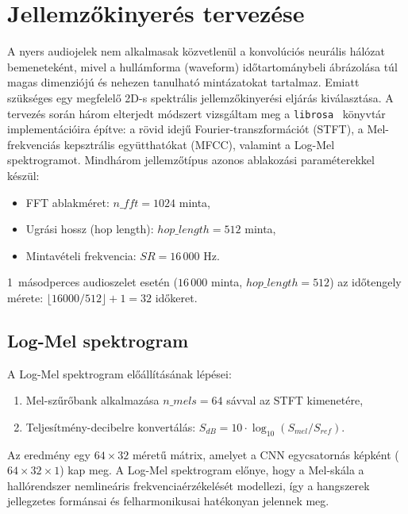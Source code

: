 \section{Jellemzőkinyerés tervezése}
\label{sec:feature_extraction}

A nyers audiojelek nem alkalmasak közvetlenül a konvolúciós neurális hálózat bemeneteként, mivel a hullámforma (waveform) időtartománybeli ábrázolása túl magas dimenziójú és nehezen tanulható mintázatokat tartalmaz. Emiatt szükséges egy megfelelő 2D-s spektrális jellemzőkinyerési eljárás kiválasztása. A tervezés során három elterjedt módszert vizsgáltam meg a \texttt{librosa}~\cite{mcfee2015librosa} könyvtár implementációira építve: a rövid idejű Fourier-transzformációt (STFT), a Mel-frekvenciás kepsztrális együtthatókat (MFCC), valamint a Log-Mel spektrogramot. Mindhárom jellemzőtípus azonos ablakozási paraméterekkel készül:

\begin{itemize}
  \item FFT ablakméret: $n\_fft = 1024$ minta,
  \item Ugrási hossz (hop length): $hop\_length = 512$ minta,
  \item Mintavételi frekvencia: $SR = 16\,000$ Hz.
\end{itemize}

1~másodperces audioszelet esetén ($16\,000$ minta, $hop\_length = 512$) az időtengely mérete: $\lfloor 16000 / 512 \rfloor + 1 = 32$ időkeret.

\subsection{Log-Mel spektrogram}

A Log-Mel spektrogram előállításának lépései:

\begin{enumerate}
  \item Mel-szűrőbank alkalmazása $n\_mels = 64$ sávval az STFT kimenetére,
  \item Teljesítmény-decibelre konvertálás: $S_{dB} = 10 \cdot \log_{10}(S_{mel} / S_{ref})$.
\end{enumerate}

Az eredmény egy $64 \times 32$ méretű mátrix, amelyet a CNN egycsatornás képként ($64 \times 32 \times 1$) kap meg. A Log-Mel spektrogram előnye, hogy a Mel-skála a hallórendszer nemlineáris frekvenciaérzékelését modellezi, így a hangszerek jellegzetes formánsai és felharmonikusai hatékonyan jelennek meg.

